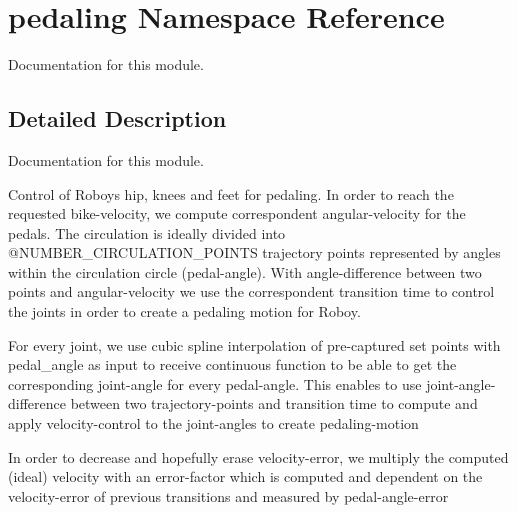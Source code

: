\hypertarget{namespacepedaling}{}\section{pedaling Namespace Reference}
\label{namespacepedaling}


Documentation for this module.  




\subsection{Detailed Description}
Documentation for this module. 

Control of Roboys\textquotesingle{} hip, knees and feet for pedaling. In order to reach the requested bike-\/velocity, we compute correspondent angular-\/velocity for the pedals. The circulation is ideally divided into @\+N\+U\+M\+B\+E\+R\+\_\+\+C\+I\+R\+C\+U\+L\+A\+T\+I\+O\+N\+\_\+\+P\+O\+I\+N\+TS trajectory points represented by angles within the circulation circle (pedal-\/angle). With angle-\/difference between two points and angular-\/velocity we use the correspondent transition time to control the joints in order to create a pedaling motion for Roboy.

For every joint, we use cubic spline interpolation of pre-\/captured set points with pedal\+\_\+angle as input to receive continuous function to be able to get the corresponding joint-\/angle for every pedal-\/angle. This enables to use joint-\/angle-\/difference between two trajectory-\/points and transition time to compute and apply velocity-\/control to the joint-\/angles to create pedaling-\/motion

In order to decrease and hopefully erase velocity-\/error, we multiply the computed (ideal) velocity with an error-\/factor which is computed and dependent on the velocity-\/error of previous transitions and measured by pedal-\/angle-\/error 